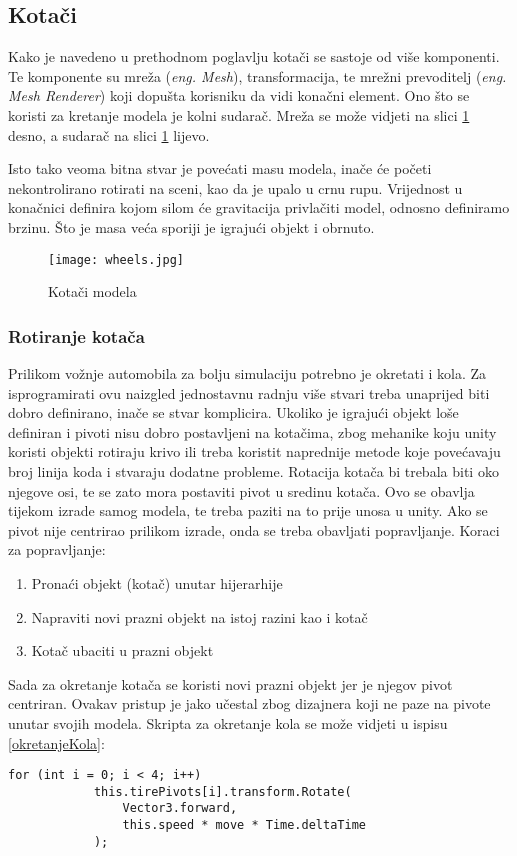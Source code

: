 \subsection{Kotači}
Kako je navedeno u prethodnom poglavlju kotači se sastoje od više komponenti. Te komponente su mreža (\emph{eng. Mesh}), transformacija, te mrežni prevoditelj (\emph{eng. Mesh Renderer}) koji dopušta korisniku da vidi konačni element. Ono što se koristi za kretanje modela je kolni sudarač. Mreža se može vidjeti na slici \ref{fig:kotaci} desno, a sudarač na slici \ref{fig:kotaci} lijevo. \par
Isto tako veoma bitna stvar je povećati masu modela, inače će početi nekontrolirano rotirati na sceni, kao da je upalo u crnu rupu. Vrijednost u konačnici definira kojom silom će gravitacija privlačiti model, odnosno definiramo brzinu. Što je masa veća sporiji je igrajući objekt i obrnuto.

\begin{figure}[h]
	\texttt{[image: wheels.jpg]}
	\centering
	\caption{Kotači modela}
	\label{fig:kotaci}
\end{figure}

\subsubsection{Rotiranje kotača}
Prilikom vožnje automobila za bolju simulaciju potrebno je okretati i kola. Za isprogramirati ovu naizgled jednostavnu radnju više stvari treba unaprijed biti dobro definirano, inače se stvar komplicira. Ukoliko je igrajući objekt loše definiran i pivoti nisu dobro postavljeni na kotačima, zbog mehanike koju unity koristi objekti rotiraju krivo ili treba koristit naprednije metode koje povećavaju broj linija koda i stvaraju dodatne probleme. 
\newpage
Rotacija kotača bi trebala biti oko njegove osi, te se zato mora postaviti pivot u sredinu kotača. Ovo se obavlja tijekom izrade samog modela, te treba paziti na to prije unosa u unity. Ako se pivot nije centrirao prilikom izrade, onda se treba obavljati popravljanje. Koraci za popravljanje:

\begin{enumerate}
	\item Pronaći objekt (kotač) unutar hijerarhije
	\item Napraviti novi prazni objekt na istoj razini kao i kotač
	\item Kotač ubaciti u prazni objekt
\end{enumerate}
Sada za okretanje kotača se koristi novi prazni objekt jer je njegov pivot centriran. Ovakav pristup je jako učestal zbog dizajnera koji ne paze na pivote unutar svojih modela. Skripta za okretanje kola se može vidjeti u ispisu \ref{okretanjeKola}:
\begin{lstlisting}[caption={Skripta za okretanje kola}, label=okretanjeKola]
for (int i = 0; i < 4; i++) 
			this.tirePivots[i].transform.Rotate(
			    Vector3.forward, 
			    this.speed * move * Time.deltaTime
			);	
\end{lstlisting}

